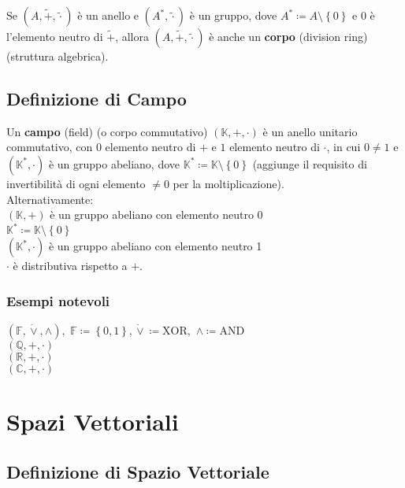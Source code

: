\documentclass[a4paper, twoside, italian, 11pt]{book}
\newcommand{\braces}[1] {\left \{ #1 \right \}}
\newcommand{\Q}{\mathbb Q}
\newcommand{\R}{\mathbb R}
\newcommand{\C}{\mathbb C}
\newcommand{\K}{\mathbb K}
\newcommand{\F}{\mathbb F}
\begin{document}
Se $(A, \tilde +, \tilde \cdot)$ è un anello e $(A^*, \tilde\cdot)$ è un gruppo, dove $A^* \coloneqq A \setminus \braces{0}$ e $0$ è l'elemento neutro di $\tilde +$, allora $(A, \tilde +, \tilde\cdot)$ è anche un \textbf{corpo} (division ring) (struttura algebrica). \\



\section{Definizione di Campo}

Un \textbf{campo} (field) (o corpo commutativo) $(\K, +, \cdot)$ è un anello unitario commutativo, con $0$ elemento neutro di $+$ e $1$ elemento neutro di $\cdot$, in cui $0 \neq 1$ e $(\K^*, \cdot)$ è un gruppo abeliano, dove $\K^* \coloneqq \K \setminus \braces{0}$ (aggiunge il requisito di invertibilità di ogni elemento $\neq 0$ per la moltiplicazione). \\

\noindent
Alternativamente: \\

$(\K, +)$ è un gruppo abeliano con elemento neutro 0 \\
\indent
$\K^* \coloneqq \K \setminus \braces{0}$ \\
\indent
$(\K^*, \cdot)$ è un gruppo abeliano con elemento neutro 1 \\
\indent
$\cdot$ è distributiva rispetto a $+$.


\subsection{Esempi notevoli}

$(\F, \dot\lor, \land),$ $\F \coloneqq \braces{0, 1}, \dot\lor \coloneqq \text{XOR},$ $\land \coloneqq \text{AND}$ \\
$(\Q, +, \cdot)$ \\
$(\R, +, \cdot)$ \\
$(\C, +, \cdot)$





\chapter {Spazi Vettoriali}



\section{Definizione di Spazio Vettoriale}
\end{document}
